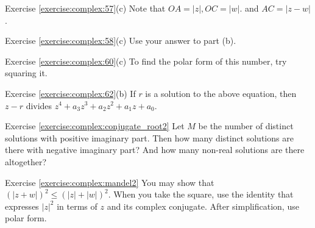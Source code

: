 \noindent Exercise \ref{exercise:complex:57}(c)
Note that $OA = |z|, OC = |w|.$ and $AC = |z-w|$.

\noindent Exercise \ref{exercise:complex:58}(c)
Use your answer to part (b).

\noindent Exercise \ref{exercise:complex:60}(c)
 To find the polar form of this number, try squaring it.

\noindent Exercise \ref{exercise:complex:62}(b)
If $r$ is a solution to the above equation, then $z-r$ divides  $z^4 + a_{3}z^{3} + a_{2} z^{2}+ a_1 z  + a_0$.

\noindent Exercise \ref{exercise:complex:conjugate_root2}
 Let $M$ be the number of distinct solutions with positive imaginary part. Then how many distinct solutions are there with negative imaginary part? And how many non-real solutions are there altogether?

\noindent Exercise \ref{exercise:complex:mandel2}
 You may show that $(|z+w|)^2 \le (|z| + |w|)^2$.  When you take the square, use the identity that expresses $|z|^2$ in terms of $z$ and its complex conjugate.  After simplification, use polar form.  